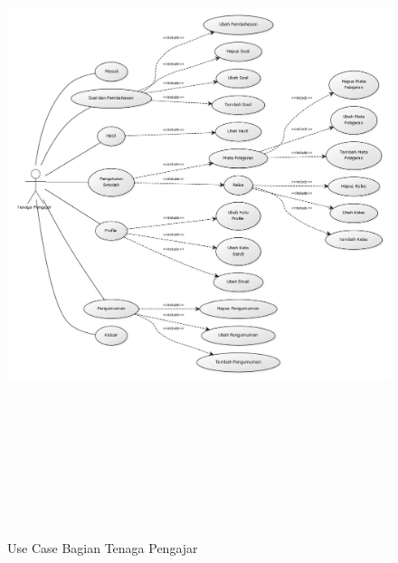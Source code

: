 \documentclass{scrreprt}
\begin{document}
		\begin{figure}
			\includegraphics[width=18cm, height=20cm]{usecase-tenaga-pengajar.jpg}
			\caption{Use Case Bagian Tenaga Pengajar}
		\end{figure}
	
\end{document}
